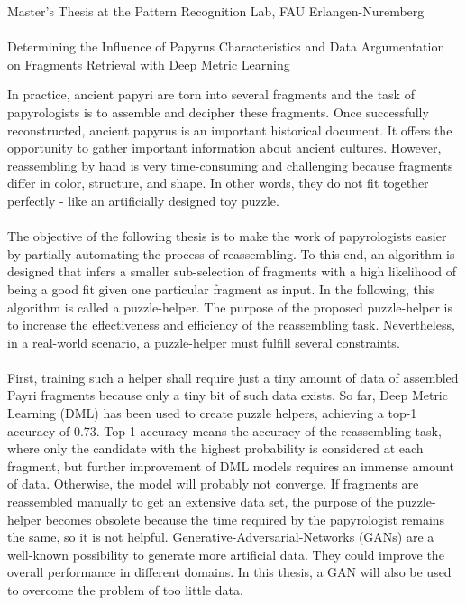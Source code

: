 \documentclass[12pt,a4paper]{article}
\begin{document}
\begin{center}
	Master's Thesis at the Pattern Recognition Lab, FAU Erlangen-Nuremberg \hfill \\[5mm]
																				
	\mbox{}\\
	{\Large Determining the Influence of Papyrus Characteristics and Data Argumentation on Fragments Retrieval with Deep Metric Learning}
			
\end{center}


In practice, ancient papyri are torn into several fragments and the task of papyrologists is to assemble and decipher these fragments. Once successfully reconstructed, ancient papyrus is an important historical document. It offers the opportunity to gather important information about ancient cultures.
However, reassembling by hand is very time-consuming and challenging because fragments differ in color, structure, and shape. In other words, they do not fit together perfectly - like an artificially designed toy puzzle. 
\\\\
The objective of the following thesis is to make the work of papyrologists easier by partially automating the process of reassembling. To this end, an algorithm is designed that infers a smaller sub-selection of fragments with a high likelihood of being a good fit given one particular fragment as input. 
In the following, this algorithm is called a puzzle-helper. The purpose of the proposed puzzle-helper is to increase the effectiveness and efficiency of the reassembling task.  Nevertheless, in a real-world scenario, a puzzle-helper must fulfill several constraints.
\\\\
First, training such a helper shall require just a tiny amount of data of assembled Payri fragments because only a tiny bit of such data exists. So far, Deep Metric Learning (DML) has been used to create puzzle helpers, achieving a top-1 accuracy of 0.73. Top-1 accuracy means the accuracy of the reassembling task, where only the candidate with the highest probability is considered at each fragment, but further improvement of DML models requires an immense amount of data. Otherwise, the model will probably not converge. If fragments are reassembled manually to get an extensive data set, the purpose of the puzzle-helper becomes obsolete because the time required by the papyrologist remains the same, so it is not helpful. Generative-Adversarial-Networks (GANs) are a well-known possibility to generate more artificial data. They could improve the overall performance in different domains. In this thesis, a GAN will also be used to overcome the problem of too little data. 
\end{document}
